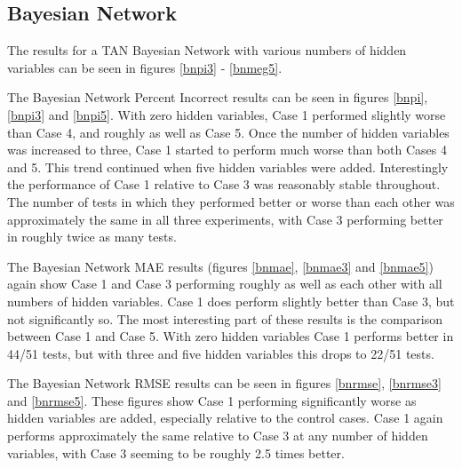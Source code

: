 \linespread{1.0}








\linespread{1.3}


\subsection{Bayesian Network}

The results for a TAN Bayesian Network with various numbers of hidden variables can be seen in figures \ref{bnpi3} - \ref{bnmeg5}.

The Bayesian Network Percent Incorrect results can be seen in figures \ref{bnpi}, \ref{bnpi3} and \ref{bnpi5}. With zero hidden variables, Case 1 performed slightly worse than Case 4, and roughly as well as Case 5. Once the number of hidden variables was increased to three, Case 1 started to perform much worse than both Cases 4 and 5. This trend continued when five hidden variables were added. Interestingly the performance of Case 1 relative to Case 3 was reasonably stable throughout. The number of tests in which they performed better or worse than each other was approximately the same in all three experiments, with Case 3 performing better in roughly twice as many tests.

The Bayesian Network MAE results (figures \ref{bnmae}, \ref{bnmae3} and \ref{bnmae5}) again show Case 1 and Case 3 performing roughly as well as each other with all numbers of hidden variables. Case 1 does perform slightly better than Case 3, but not significantly so. The most interesting part of these results is the comparison between Case 1 and Case 5. With zero hidden variables Case 1 performs better in 44/51 tests, but with three and five hidden variables this drops to 22/51 tests.

The Bayesian Network RMSE results can be seen in figures \ref{bnrmse}, \ref{bnrmse3} and \ref{bnrmse5}. These figures show Case 1 performing significantly worse as hidden variables are added, especially relative to the control cases. Case 1 again performs approximately the same relative to Case 3 at any number of hidden variables, with Case 3 seeming to be roughly 2.5 times better.

